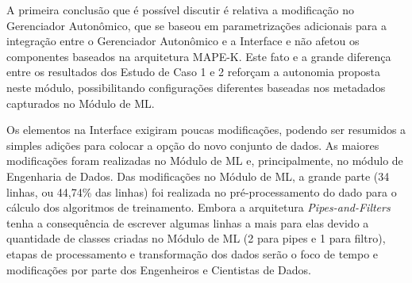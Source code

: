 \documentclass[portugues]{ic-tese}
\begin{document}
\begin{table}[H]
\begin{center}
  \caption{Quantidade de modificações realizadas ao adicionar um novo conjunto de dados ao Módulo de ML}
\label{tbl:ManutencaoPipelineDataset}
\end{center}
\end{table}

A primeira conclusão que é possível discutir é relativa a modificação no Gerenciador Autonômico, que se baseou em parametrizações adicionais para a integração entre o Gerenciador Autonômico e a Interface e não afetou os componentes baseados na arquitetura MAPE-K. Este fato e a grande diferença entre os resultados dos Estudo de Caso 1 e 2 reforçam a autonomia proposta neste módulo, possibilitando configurações diferentes baseadas nos metadados capturados no Módulo de ML.

Os elementos na Interface exigiram poucas modificações, podendo ser resumidos a simples adições para colocar a opção do novo conjunto de dados. As maiores modificações foram realizadas no Módulo de ML e, principalmente, no módulo de Engenharia de Dados. Das modificações no Módulo de ML, a grande parte (34 linhas, ou 44,74\% das linhas) foi realizada no pré-processamento do dado para o cálculo dos algoritmos de treinamento. Embora a arquitetura \textit{Pipes-and-Filters} tenha a consequência de escrever algumas linhas a mais para elas devido a quantidade de classes criadas no Módulo de ML (2 para pipes e 1 para filtro), etapas de processamento e transformação dos dados serão o foco de tempo e modificações por parte dos Engenheiros e Cientistas de Dados.
\end{document}
